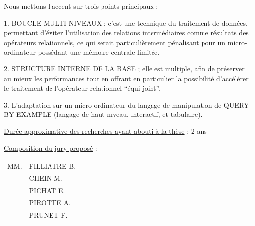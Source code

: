Nous mettons l'accent sur trois points principaux :

1. BOUCLE MULTI-NIVEAUX ; c'est une technique du traitement de données, permettant d'éviter l'utilisation des relations intermédiaires comme résultats des opérateurs relationnels, ce qui serait particulièrement pénalisant pour un micro-ordinateur possédant une mémoire centrale limitée.

2. STRUCTURE INTERNE DE LA BASE ; elle est multiple, afin de préserver au mieux les performances tout en offrant en particulier la possibilité d'accélérer le traitement de l'opérateur relationnel ``équi-joint''.

3. L'adaptation sur un micro-ordinateur du langage de manipulation de QUERY-BY-EXAMPLE (langage de haut niveau, interactif, et tabulaire).

\uline{Durée approximative des recherches ayant abouti à la thèse} : 2 ans

\uline{Composition du jury proposé} :

\begin{tabular}{ll}
MM. & FILLIATRE B.\\
& CHEIN M.\\
& PICHAT E.\\
& PIROTTE A.\\
& PRUNET F.
\end{tabular}

